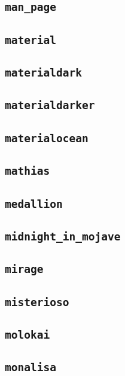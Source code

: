 \subsection{\texttt{man\_page}}
\newpage
\subsection{\texttt{material}}
\newpage
\subsection{\texttt{materialdark}}
\newpage
\subsection{\texttt{materialdarker}}
\newpage
\subsection{\texttt{materialocean}}
\newpage
\subsection{\texttt{mathias}}
\newpage
\subsection{\texttt{medallion}}
\newpage
\subsection{\texttt{midnight\_in\_mojave}}
\newpage
\subsection{\texttt{mirage}}
\newpage
\subsection{\texttt{misterioso}}
\newpage
\subsection{\texttt{molokai}}
\newpage
\subsection{\texttt{monalisa}}
\newpage

